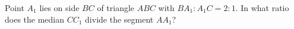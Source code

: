 Point $A_1$ lies on side $BC$ of triangle $ABC$ with $BA_1:A_1C=2:1$. In what ratio does the median $CC_1$ divide the segment $AA_1$?
